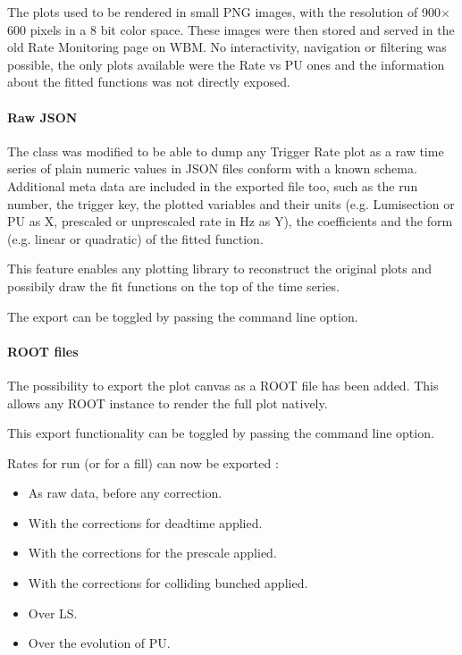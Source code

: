 The plots used to be rendered in small PNG images, with the resolution of 900$\times$600 pixels in a 8 bit color space. These images were then stored and served in the old Rate Monitoring page on WBM. No interactivity, navigation or filtering was possible, the only plots available were the Rate vs PU ones and the information about the fitted functions was not directly exposed.

\paragraph{Raw JSON}

The  class was modified \cite{RootexporttoggleJSONexportfunction6MergeRequestsCMSTSGFOGratemonGitLab-2020-10-07} to be able to dump any Trigger Rate plot as a raw time series of plain numeric values in JSON files conform with a known \cite{avivacemasterthesisMyWIPmasterthesisinComputerScienceExperimentalAnomalyDetectiononCERNCMSTriggerRates-2020-10-16} schema. Additional meta data are included in the exported file too, such as the run number, the trigger key, the plotted variables and their units (e.g. Lumisection or PU as X, prescaled or unprescaled rate in Hz as Y), the coefficients and the form (e.g. linear or quadratic) of the fitted function.

This feature enables any plotting library to reconstruct the original plots and possibily draw the fit functions on the top of the time series.

The export can be toggled by passing the  command line option.

\paragraph{ROOT files}

The possibility to export the plot canvas as a ROOT file has been added. This allows any ROOT instance to render the full plot natively.

This export functionality can be toggled by passing the  command line option.

Rates for run (or for a fill) can now be exported \label{expoptions}:

\begin{itemize}
    \item As raw data, before any correction.
    \item With the corrections for deadtime applied.
    \item With the corrections for the prescale applied.
    \item With the corrections for colliding bunched applied.
    \item Over LS.
    \item Over the evolution of PU.
\end{itemize}

